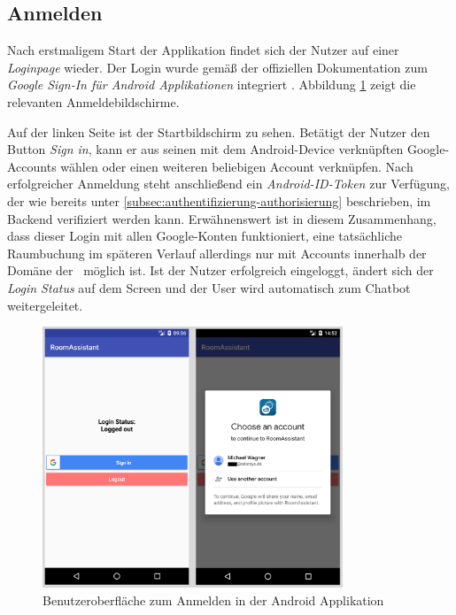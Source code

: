 \subsection{Anmelden}
\label{subsec:login-activity}

Nach erstmaligem Start der Applikation findet sich der Nutzer auf einer \textit{Loginpage} wieder. Der Login wurde gemäß der offiziellen Dokumentation zum \textit{Google Sign-In für Android Applikationen} integriert \cite{google_developers_integrating_2018}. Abbildung \ref{fig:android-login-screen} zeigt die relevanten \mbox{Anmeldebildschirme}. 

Auf der linken Seite ist der Startbildschirm zu sehen. Betätigt der Nutzer den Button \textit{Sign in}, kann er aus seinen mit dem Android-Device verknüpften Google-Accounts wählen oder einen weiteren beliebigen Account verknüpfen. Nach erfolgreicher Anmeldung steht anschließend ein \textit{Android-\ac{ID}-Token} zur Verfügung, der wie bereits unter \ref{subsec:authentifizierung-authorisierung} beschrieben, im Backend verifiziert werden kann. Erwähnenswert ist in diesem Zusammenhang, dass dieser Login mit allen Google-Konten funktioniert, eine tatsächliche Raumbuchung im späteren Verlauf allerdings nur mit Accounts innerhalb der Domäne der \adorsys\ möglich ist. Ist der Nutzer erfolgreich eingeloggt, ändert sich der \textit{Login Status} auf dem Screen und der User wird automatisch zum Chatbot weitergeleitet.
\newline

\begin{figure}[H]
    \centering
    \includegraphics[width=0.8\textwidth]{bilder/LoginScreenCombined.png}
    \caption{Benutzeroberfläche zum Anmelden in der Android Applikation}
    \label{fig:android-login-screen}
\end{figure}

